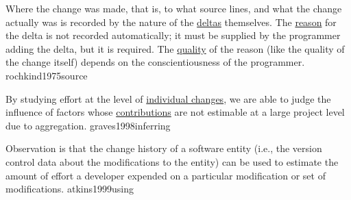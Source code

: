 \documentclass{article}
\begin{document}

  {Where the change was made, that is, to what source lines, and what the change actually was is recorded by the nature of the \ul{deltas} themselves. The \ul{reason} for the delta is not recorded automatically; it must be supplied by the programmer adding the delta, but it is required. The \ul{quality} of the reason (like the quality of the change itself) depends on the conscientiousness of the programmer.}
  {rochkind1975source}

  {By studying effort at the level of \ul{individual changes}, we are able to judge the influence of factors whose \ul{contributions} are not estimable at a large project level due to aggregation.}
  {graves1998inferring}


  {Observation is that the change history of a software entity (i.e., the version control data about the modifications to the entity) can be used to estimate the amount of effort a developer expended on a particular modification or set of modifications.}
  {atkins1999using}
\end{document}
